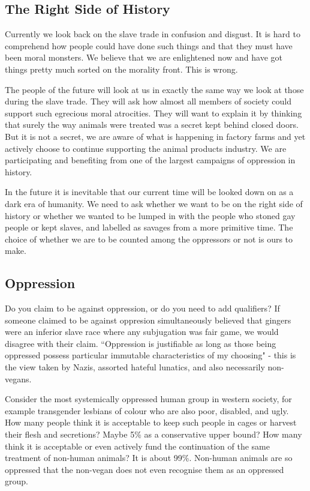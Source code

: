 \subsection{The Right Side of History}

Currently we look back on the slave trade in confusion and disgust. It is hard to comprehend how people could have done such things and that they must have been moral monsters. We believe that we are enlightened now and have got things pretty much sorted on the morality front. This is wrong.

The people of the future will look at us in exactly the same way we look at those during the slave trade. They will ask how almost all members of society could support such egrecious moral atrocities. They will want to explain it by thinking that surely the way animals were treated was a secret kept behind closed doors. But it is not a secret, we are aware of what is happening in factory farms and yet actively choose to continue supporting the animal products industry. We are participating and benefiting from one of the largest campaigns of oppression in history.

In the future it is inevitable that our current time will be looked down on as a dark era of humanity. We need to ask whether we want to be on the right side of history or whether we wanted to be lumped in with the people who stoned gay people or kept slaves, and labelled as savages from a more primitive time. The choice of whether we are to be counted among the oppressors or not is ours to make.

\subsection{Oppression}

Do you claim to be against oppression, or do you need to add qualifiers? If someone claimed to be against oppresion simultaneously believed that gingers were an inferior slave race where any subjugation was fair game, we would disagree with their claim. ``Oppression is justifiable as long as those being oppressed possess particular immutable characteristics of my choosing" - this is the view taken by Nazis, assorted hateful lunatics, and also necessarily non-vegans.

Consider the most systemically oppressed human group in western society, for example transgender lesbians of colour who are also poor, disabled, and ugly. How many people think it is acceptable to keep such people in cages or harvest their flesh and secretions? Maybe 5\% as a conservative upper bound? How many think it is acceptable or even actively fund the continuation of the same treatment of non-human animals? It is about 99\%. Non-human animals are so oppressed that the non-vegan does not even recognise them as an oppressed group.


